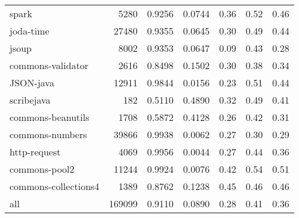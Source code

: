\begin{table*}
\begin{tabular}{lrrrrrr}
                  spark &    5280 &          0.9256 &          0.0744 &         0.36 &         0.52 &             0.46 \\
              joda-time &   27480 &          0.9355 &          0.0645 &         0.30 &         0.49 &             0.44 \\
                  jsoup &    8002 &          0.9353 &          0.0647 &         0.09 &         0.43 &             0.28 \\
      commons-validator &    2616 &          0.8498 &          0.1502 &         0.30 &         0.38 &             0.34 \\
              JSON-java &   12911 &          0.9844 &          0.0156 &         0.23 &         0.51 &             0.44 \\
             scribejava &     182 &          0.5110 &          0.4890 &         0.32 &         0.49 &             0.41 \\
      commons-beanutils &    1708 &          0.5872 &          0.4128 &         0.26 &         0.42 &             0.31 \\
        commons-numbers &   39866 &          0.9938 &          0.0062 &         0.27 &         0.30 &             0.29 \\
           http-request &    4069 &          0.9956 &          0.0044 &         0.27 &         0.44 &             0.36 \\
          commons-pool2 &   11244 &          0.9924 &          0.0076 &         0.42 &         0.54 &             0.51 \\
   commons-collections4 &    1389 &          0.8762 &          0.1238 &         0.45 &         0.46 &             0.46 \\
                    all &  169099 &          0.9110 &          0.0890 &         0.28 &         0.41 &             0.36 \\
\bottomrule
\end{tabular}
\end{table*}
